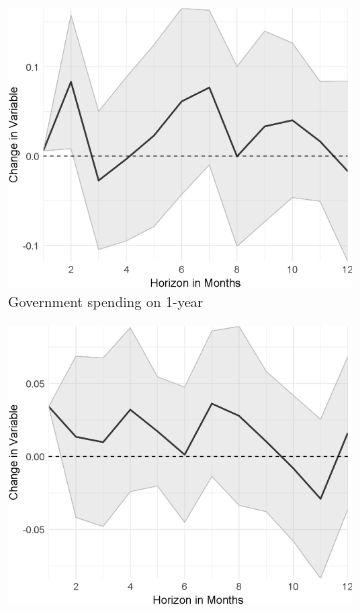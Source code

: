 
\begin{figure}[H]
	\centering
	\captionsetup{font=footnotesize}
	\begin{subfigure}{00.32\textwidth}
	\includegraphics[width=1\textwidth]{output/lp/baseline/diff/government_spending/government_spendingonexpectations1y_djn.eps}
	\caption{Government spending on 1-year}
\end{subfigure}
\begin{subfigure}{00.32\textwidth}
	\includegraphics[width=1\textwidth]{output/lp/baseline/diff/monetary_policy/monetary_policyonexpectations3y_djn.eps}

\end{subfigure}
\end{figure}

